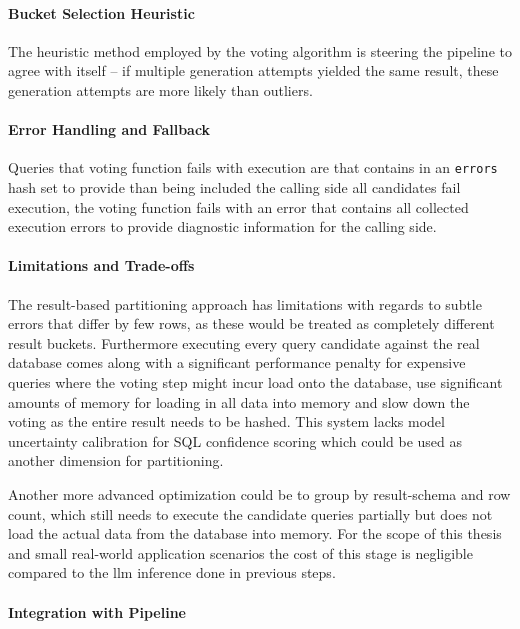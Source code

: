 \paragraph{Bucket Selection Heuristic}

The heuristic method employed by the voting algorithm is steering the pipeline
to agree with itself – if multiple generation attempts yielded the same result,
these generation attempts are more likely than outliers.

\paragraph{Error Handling and Fallback}

Queries that voting function fails with execution are that contains in an
\texttt{errors} hash set to provide than being included the calling side all
candidates fail execution, the voting function fails with an error that
contains all collected execution errors to provide diagnostic information for
the calling side.

\paragraph{Limitations and Trade-offs}

The result-based partitioning approach has limitations with regards to subtle
errors that differ by few rows, as these would be treated as completely
different result buckets. Furthermore executing every query candidate against
the real database comes along with a significant performance penalty for
expensive queries where the voting step might incur load onto the database, use
significant amounts of memory for loading in all data into memory and slow down
the voting as the entire result needs to be hashed. This system lacks model
uncertainty calibration for SQL confidence scoring which could be used as
another dimension for partitioning.

Another more advanced optimization could be to group by result-schema and row
count, which still needs to execute the candidate queries partially but does
not load the actual data from the database into memory. For the scope of this
thesis and small real-world application scenarios the cost of this stage is
negligible compared to the llm inference done in previous steps. 

\paragraph{Integration with Pipeline}

